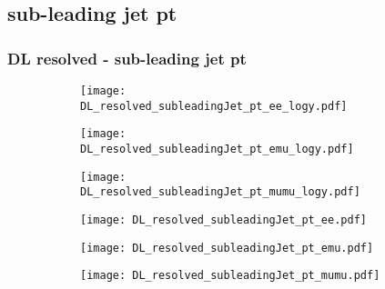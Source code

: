 \documentclass[aspectratio=169,8pt]{beamer}
\begin{document}
\subsection{sub-leading jet pt}
\begin{frame}
\frametitle{DL resolved - sub-leading jet pt}
\begin{figure}
\captionsetup[subfigure]{labelformat=empty}
\begin{subfigure}{0.32\textwidth}
\texttt{[image: DL\_resolved\_subleadingJet\_pt\_ee\_logy.pdf]}
\vspace*{-0.15cm}
\end{subfigure}
\hfil
\begin{subfigure}{0.32\textwidth}
\texttt{[image: DL\_resolved\_subleadingJet\_pt\_emu\_logy.pdf]}
\vspace*{-0.15cm}
\end{subfigure}
\hfil
\begin{subfigure}{0.32\textwidth}
\texttt{[image: DL\_resolved\_subleadingJet\_pt\_mumu\_logy.pdf]}
\vspace*{-0.15cm}
\end{subfigure}
\hfil
\begin{subfigure}{0.32\textwidth}
\texttt{[image: DL\_resolved\_subleadingJet\_pt\_ee.pdf]}
\vspace*{-0.15cm}
\end{subfigure}
\hfil
\begin{subfigure}{0.32\textwidth}
\texttt{[image: DL\_resolved\_subleadingJet\_pt\_emu.pdf]}
\vspace*{-0.15cm}
\end{subfigure}
\hfil
\begin{subfigure}{0.32\textwidth}
\texttt{[image: DL\_resolved\_subleadingJet\_pt\_mumu.pdf]}
\vspace*{-0.15cm}
\end{subfigure}
\hfil
\end{figure}
\end{frame}
\newpage
\end{document}
